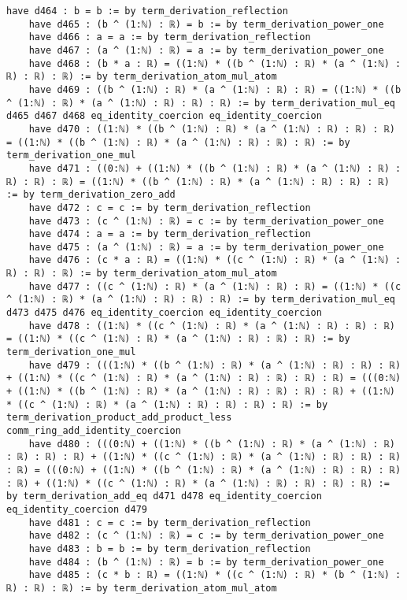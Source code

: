 \documentclass{article}
\begin{document}
\begin{tcolorbox}[colback=white!10, width=\linewidth]
\begin{lstlisting}[language=Lean4]
    have d464 : b = b := by term_derivation_reflection
    have d465 : (b ^ (1:ℕ) : ℝ) = b := by term_derivation_power_one
    have d466 : a = a := by term_derivation_reflection
    have d467 : (a ^ (1:ℕ) : ℝ) = a := by term_derivation_power_one
    have d468 : (b * a : ℝ) = ((1:ℕ) * ((b ^ (1:ℕ) : ℝ) * (a ^ (1:ℕ) : ℝ) : ℝ) : ℝ) := by term_derivation_atom_mul_atom
    have d469 : ((b ^ (1:ℕ) : ℝ) * (a ^ (1:ℕ) : ℝ) : ℝ) = ((1:ℕ) * ((b ^ (1:ℕ) : ℝ) * (a ^ (1:ℕ) : ℝ) : ℝ) : ℝ) := by term_derivation_mul_eq d465 d467 d468 eq_identity_coercion eq_identity_coercion
    have d470 : ((1:ℕ) * ((b ^ (1:ℕ) : ℝ) * (a ^ (1:ℕ) : ℝ) : ℝ) : ℝ) = ((1:ℕ) * ((b ^ (1:ℕ) : ℝ) * (a ^ (1:ℕ) : ℝ) : ℝ) : ℝ) := by term_derivation_one_mul
    have d471 : ((0:ℕ) + ((1:ℕ) * ((b ^ (1:ℕ) : ℝ) * (a ^ (1:ℕ) : ℝ) : ℝ) : ℝ) : ℝ) = ((1:ℕ) * ((b ^ (1:ℕ) : ℝ) * (a ^ (1:ℕ) : ℝ) : ℝ) : ℝ) := by term_derivation_zero_add
    have d472 : c = c := by term_derivation_reflection
    have d473 : (c ^ (1:ℕ) : ℝ) = c := by term_derivation_power_one
    have d474 : a = a := by term_derivation_reflection
    have d475 : (a ^ (1:ℕ) : ℝ) = a := by term_derivation_power_one
    have d476 : (c * a : ℝ) = ((1:ℕ) * ((c ^ (1:ℕ) : ℝ) * (a ^ (1:ℕ) : ℝ) : ℝ) : ℝ) := by term_derivation_atom_mul_atom
    have d477 : ((c ^ (1:ℕ) : ℝ) * (a ^ (1:ℕ) : ℝ) : ℝ) = ((1:ℕ) * ((c ^ (1:ℕ) : ℝ) * (a ^ (1:ℕ) : ℝ) : ℝ) : ℝ) := by term_derivation_mul_eq d473 d475 d476 eq_identity_coercion eq_identity_coercion
    have d478 : ((1:ℕ) * ((c ^ (1:ℕ) : ℝ) * (a ^ (1:ℕ) : ℝ) : ℝ) : ℝ) = ((1:ℕ) * ((c ^ (1:ℕ) : ℝ) * (a ^ (1:ℕ) : ℝ) : ℝ) : ℝ) := by term_derivation_one_mul
    have d479 : (((1:ℕ) * ((b ^ (1:ℕ) : ℝ) * (a ^ (1:ℕ) : ℝ) : ℝ) : ℝ) + ((1:ℕ) * ((c ^ (1:ℕ) : ℝ) * (a ^ (1:ℕ) : ℝ) : ℝ) : ℝ) : ℝ) = (((0:ℕ) + ((1:ℕ) * ((b ^ (1:ℕ) : ℝ) * (a ^ (1:ℕ) : ℝ) : ℝ) : ℝ) : ℝ) + ((1:ℕ) * ((c ^ (1:ℕ) : ℝ) * (a ^ (1:ℕ) : ℝ) : ℝ) : ℝ) : ℝ) := by term_derivation_product_add_product_less comm_ring_add_identity_coercion
    have d480 : (((0:ℕ) + ((1:ℕ) * ((b ^ (1:ℕ) : ℝ) * (a ^ (1:ℕ) : ℝ) : ℝ) : ℝ) : ℝ) + ((1:ℕ) * ((c ^ (1:ℕ) : ℝ) * (a ^ (1:ℕ) : ℝ) : ℝ) : ℝ) : ℝ) = (((0:ℕ) + ((1:ℕ) * ((b ^ (1:ℕ) : ℝ) * (a ^ (1:ℕ) : ℝ) : ℝ) : ℝ) : ℝ) + ((1:ℕ) * ((c ^ (1:ℕ) : ℝ) * (a ^ (1:ℕ) : ℝ) : ℝ) : ℝ) : ℝ) := by term_derivation_add_eq d471 d478 eq_identity_coercion eq_identity_coercion d479
    have d481 : c = c := by term_derivation_reflection
    have d482 : (c ^ (1:ℕ) : ℝ) = c := by term_derivation_power_one
    have d483 : b = b := by term_derivation_reflection
    have d484 : (b ^ (1:ℕ) : ℝ) = b := by term_derivation_power_one
    have d485 : (c * b : ℝ) = ((1:ℕ) * ((c ^ (1:ℕ) : ℝ) * (b ^ (1:ℕ) : ℝ) : ℝ) : ℝ) := by term_derivation_atom_mul_atom

\end{lstlisting}
\end{tcolorbox}
\end{document}
